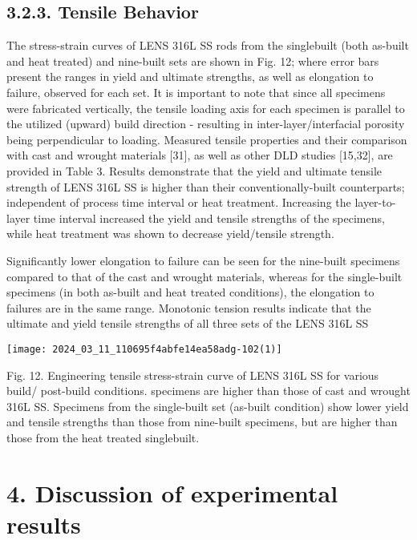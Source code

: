 \documentclass[10pt]{article}
\begin{document}
\subsection*{3.2.3. Tensile Behavior}
The stress-strain curves of LENS 316L SS rods from the singlebuilt (both as-built and heat treated) and nine-built sets are shown in Fig. 12; where error bars present the ranges in yield and ultimate strengths, as well as elongation to failure, observed for each set. It is important to note that since all specimens were fabricated vertically, the tensile loading axis for each specimen is parallel to the utilized (upward) build direction - resulting in inter-layer/interfacial porosity being perpendicular to loading. Measured tensile properties and their comparison with cast and wrought materials [31], as well as other DLD studies [15,32], are provided in Table 3. Results demonstrate that the yield and ultimate tensile strength of LENS 316L SS is higher than their conventionally-built counterparts; independent of process time interval or heat treatment. Increasing the layer-to-layer time interval increased the yield and tensile strengths of the specimens, while heat treatment was shown to decrease yield/tensile strength.

Significantly lower elongation to failure can be seen for the nine-built specimens compared to that of the cast and wrought materials, whereas for the single-built specimens (in both as-built and heat treated conditions), the elongation to failures are in the same range. Monotonic tension results indicate that the ultimate and yield tensile strengths of all three sets of the LENS 316L SS

\begin{center}
\texttt{[image: 2024\_03\_11\_110695f4abfe14ea58adg-102(1)]}
\end{center}

Fig. 12. Engineering tensile stress-strain curve of LENS 316L SS for various build/ post-build conditions. specimens are higher than those of cast and wrought 316L SS. Specimens from the single-built set (as-built condition) show lower yield and tensile strengths than those from nine-built specimens, but are higher than those from the heat treated singlebuilt.

\section*{4. Discussion of experimental results}
\end{document}
